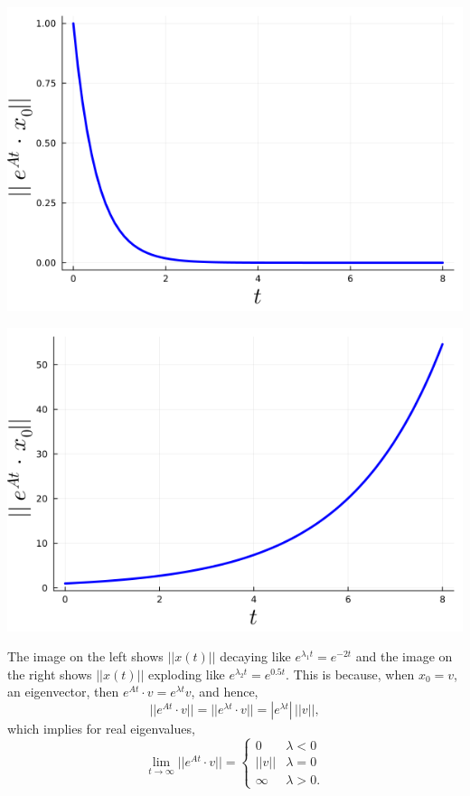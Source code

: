 \begin{center}
    \begin{minipage}{0.45\columnwidth}
        \includegraphics[width=\linewidth]{graphics/Chap09/NormSolutionX0equalsEigenvector1.png}
    \end{minipage}
    \hfill
    \begin{minipage}{0.45\columnwidth}
        \includegraphics[width=\linewidth]{graphics/Chap09/NormSolutionX0equalsEigenvector2.png}
    \end{minipage}
\end{center}
The image on the left shows $||x(t)||$ decaying like $e^{\lambda_1 t}=e^{-2t}$ and the image on the right shows $||x(t)||$ exploding like $e^{\lambda_2 t} = e^{0.5t}$. This is because, when $x_0=v$, an eigenvector, then $e^{At} \cdot v = e^{\lambda t} v$, and hence, 
$$||e^{A t} \cdot v|| = ||e^{\lambda t} \cdot v|| = |e^{\lambda t}|\, ||v||,$$
which implies for real eigenvalues, 
$$ \lim_{t \to \infty} ||e^{A t} \cdot v|| = \begin{cases}
    0 & \lambda < 0\\
    ||v|| & \lambda = 0\\
    \infty & \lambda >0.
\end{cases}$$
\Qed

